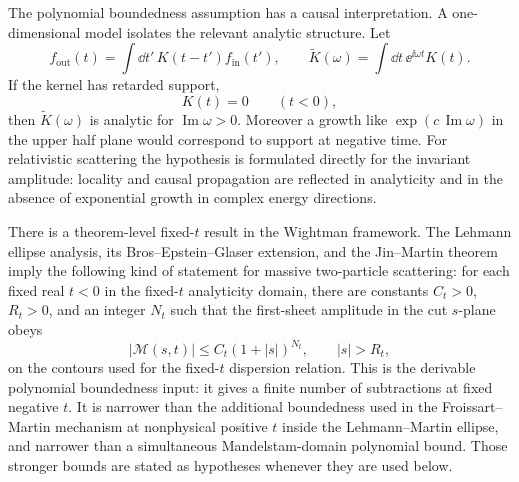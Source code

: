 The polynomial boundedness assumption has a causal interpretation.  A
one-dimensional model isolates the relevant analytic structure.  Let
\[
  f_{\mathrm{out}}(t)=\int\dd t'\,K(t-t')f_{\mathrm{in}}(t'),
  \qquad
  \widetilde K(\omega)=\int\dd t\,\ee^{\ii\omega t}K(t).
\]
If the kernel has retarded support,
\[
  K(t)=0\qquad(t<0),
\]
then \(\widetilde K(\omega)\) is analytic for \(\operatorname{Im}\omega>0\).
Moreover a growth like \(\exp(c\,\operatorname{Im}\omega)\) in the upper half
plane would correspond to support at negative time.  For relativistic
scattering the hypothesis is formulated directly for the invariant amplitude:
locality and causal propagation are reflected in analyticity and in the
absence of exponential growth in complex energy directions.

\begin{remark}
There is a theorem-level fixed-\(t\) result in the Wightman framework.  The
Lehmann ellipse analysis, its Bros--Epstein--Glaser extension, and the
Jin--Martin theorem imply the following kind of statement for massive
two-particle scattering: for each fixed real \(t<0\) in the fixed-\(t\)
analyticity domain, there are constants \(C_t>0\), \(R_t>0\), and an integer
\(N_t\) such that the first-sheet amplitude in the cut \(s\)-plane obeys
\[
  |\mathcal M(s,t)|
  \le
  C_t(1+|s|)^{N_t},
  \qquad |s|>R_t,
\]
on the contours used for the fixed-\(t\) dispersion relation.  This is the
derivable polynomial boundedness input: it gives a finite number of
subtractions at fixed negative \(t\).  It is narrower than the additional
boundedness used in the Froissart--Martin mechanism at nonphysical
positive \(t\) inside the Lehmann--Martin ellipse, and narrower than a
simultaneous Mandelstam-domain polynomial bound.  Those stronger bounds are
stated as hypotheses whenever they are used below.
\end{remark}

